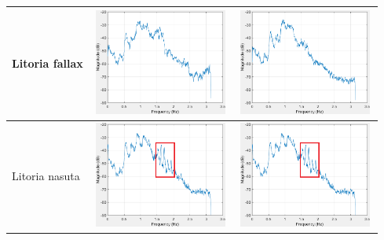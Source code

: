 \begin{table}[htb!]
{\begin{tabular}{lll}
Litoria fallax              & \begin{minipage}{.3\textwidth} \includegraphics[width=45mm, height=35mm]{image/Ch1/4_signal.png}  \end{minipage}                             &                                               \begin{minipage}{.3\textwidth} \includegraphics[width=45mm, height=35mm]{image/Ch1/4_noise.png}  \end{minipage} \\ \hline
Litoria nasuta              &   \begin{minipage}{.3\textwidth} \includegraphics[width=45mm, height=35mm]{image/Ch1/5_signal.png}  \end{minipage}                           &                                               \begin{minipage}{.3\textwidth} \includegraphics[width=45mm, height=35mm]{image/Ch1/5_signal.png}  \end{minipage} \\ \hline
\end{tabular}
}
\end{table}


